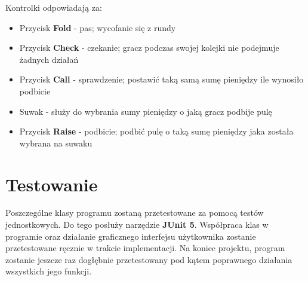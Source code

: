 \documentclass{article}
\begin{document}
            Kontrolki odpowiadają za:
            \begin{itemize}
                \item Przycisk \textbf{Fold} - pas; wycofanie się z rundy
                \item Przycisk \textbf{Check} - czekanie; gracz podczas swojej kolejki nie podejmuje żadnych działań
                \item Przycisk \textbf{Call} - sprawdzenie; postawić taką samą sumę pieniędzy ile wynosiło podbicie
                \item Suwak - służy do wybrania sumy pieniędzy o jaką gracz podbije pulę
                \item Przycisk \textbf{Raise} - podbicie; podbić pulę o taką sumę pieniędzy jaka została wybrana na suwaku
            \end{itemize}


\section{Testowanie}
    Poszczególne klasy programu zostaną przetestowane za pomocą testów jednostkowych. 
    Do tego posłuży narzędzie \textbf{JUnit 5}.
    Współpraca klas w programie oraz działanie graficznego interfejsu użytkownika zostanie przetestowane ręcznie w trakcie implementacji.
    Na koniec projektu, program zostanie jeszcze raz dogłębnie przetestowany pod kątem poprawnego działania wszystkich jego funkcji.
\end{document}
